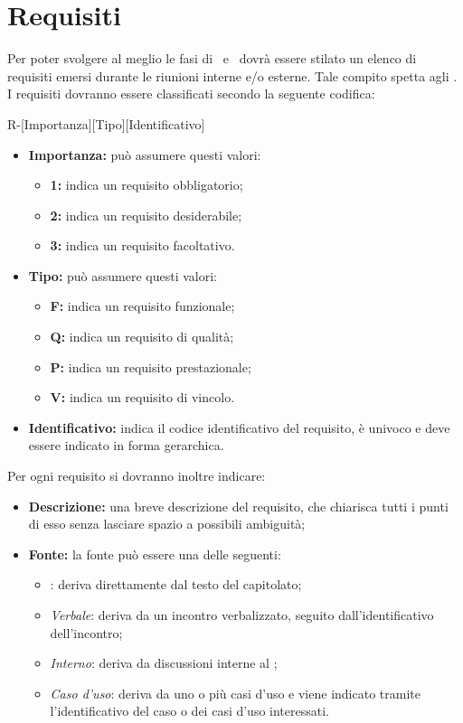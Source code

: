 \newpage
\section{Requisiti}
Per poter svolgere al meglio le fasi di \PA\ e \PD\ dovrà essere stilato un elenco di requisiti emersi durante le riunioni interne e/o esterne. Tale compito spetta agli \textit{\AnP}. I requisiti dovranno
essere classificati secondo la seguente codifica:

\begin{center}
R-[Importanza][Tipo][Identificativo]
\end{center}
\begin{itemize}
	\item \textbf{Importanza:} può assumere questi valori:
  		\begin{itemize}
    		\item \textbf{1:} indica un requisito obbligatorio;
    		\item \textbf{2:} indica un requisito desiderabile;
    		\item \textbf{3:} indica un requisito facoltativo.
  		\end{itemize}
  	\item \textbf{Tipo:} può assumere questi valori:
  		\begin{itemize}
   		 	\item \textbf{F:} indica un requisito funzionale;
    		\item \textbf{Q:} indica un requisito di qualità;
    		\item \textbf{P:} indica un requisito prestazionale;
    		\item \textbf{V:} indica un requisito di vincolo.
  		\end{itemize}
  	\item \textbf{Identificativo:} indica il codice identificativo del requisito, è univoco e deve essere indicato in forma gerarchica.
\end{itemize}
Per ogni requisito si dovranno inoltre indicare:
\begin{itemize}
  \item \textbf{Descrizione:} una breve descrizione del requisito, che chiarisca tutti i punti di esso senza lasciare spazio a possibili ambiguità;
  \item \textbf{Fonte:} la fonte può essere una delle seguenti:
  \begin{itemize}
    \item \textit{}: deriva direttamente dal testo del capitolato;
    \item \textit{Verbale}: deriva da un incontro verbalizzato, seguito dall'identificativo dell'incontro;
    \item \textit{Interno}: deriva da discussioni interne al ;
    \item \textit{Caso d'uso}: deriva da uno o più casi d'uso e viene indicato tramite l'identificativo del caso o dei casi d'uso interessati.
  \end{itemize}
\end{itemize}








